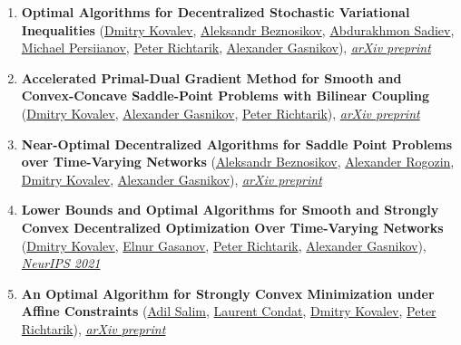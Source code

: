 \begin{enumerate}
\item \textbf{Optimal Algorithms for Decentralized Stochastic Variational Inequalities} (\href{https://www.dmitry-kovalev.com}{\color{linkcolour}Dmitry Kovalev}, \href{https://anbeznosikov.github.io}{\color{linkcolour}Aleksandr Beznosikov}, \href{https://scholar.google.com/citations?user=R-xZRIAAAAAJ&hl=ru}{\color{linkcolour}Abdurakhmon Sadiev}, \href{}{\color{linkcolour}Michael Persiianov}, \href{https://richtarik.org}{\color{linkcolour}Peter Richtarik}, \href{https://scholar.google.ru/citations?user=AmeE8qkAAAAJ}{\color{linkcolour}Alexander Gasnikov}), \href{https://arxiv.org/abs/2202.02771}{\em \color{black}arXiv preprint}
\item \textbf{Accelerated Primal-Dual Gradient Method for Smooth and Convex-Concave Saddle-Point Problems with Bilinear Coupling} (\href{https://www.dmitry-kovalev.com}{\color{linkcolour}Dmitry Kovalev}, \href{https://scholar.google.ru/citations?user=AmeE8qkAAAAJ}{\color{linkcolour}Alexander Gasnikov}, \href{https://richtarik.org}{\color{linkcolour}Peter Richtarik}), \href{https://arxiv.org/abs/2112.15199}{\em \color{black}arXiv preprint}
\item \textbf{Near-Optimal Decentralized Algorithms for Saddle Point Problems over Time-Varying Networks} (\href{https://anbeznosikov.github.io}{\color{linkcolour}Aleksandr Beznosikov}, \href{https://scholar.google.com/citations?user=sEjyzkgAAAAJ}{\color{linkcolour}Alexander Rogozin}, \href{https://www.dmitry-kovalev.com}{\color{linkcolour}Dmitry Kovalev}, \href{https://scholar.google.ru/citations?user=AmeE8qkAAAAJ}{\color{linkcolour}Alexander Gasnikov}), \href{https://arxiv.org/abs/2107.05957}{\em \color{black}arXiv preprint}
\item \textbf{Lower Bounds and Optimal Algorithms for Smooth and Strongly Convex Decentralized Optimization Over Time-Varying Networks} (\href{https://www.dmitry-kovalev.com}{\color{linkcolour}Dmitry Kovalev}, \href{https://elnurgasanov.com}{\color{linkcolour}Elnur Gasanov}, \href{https://richtarik.org}{\color{linkcolour}Peter Richtarik}, \href{https://scholar.google.ru/citations?user=AmeE8qkAAAAJ}{\color{linkcolour}Alexander Gasnikov}), \href{https://proceedings.neurips.cc/paper/2021/hash/bc37e109d92bdc1ea71da6c919d54907-Abstract.html}{\em \color{black}NeurIPS 2021}
\item \textbf{An Optimal Algorithm for Strongly Convex Minimization under Affine Constraints} (\href{https://adil-salim.github.io}{\color{linkcolour}Adil Salim}, \href{https://lcondat.github.io}{\color{linkcolour}Laurent Condat}, \href{https://www.dmitry-kovalev.com}{\color{linkcolour}Dmitry Kovalev}, \href{https://richtarik.org}{\color{linkcolour}Peter Richtarik}), \href{https://arxiv.org/abs/2102.11079}{\em \color{black}arXiv preprint}

\end{enumerate}
